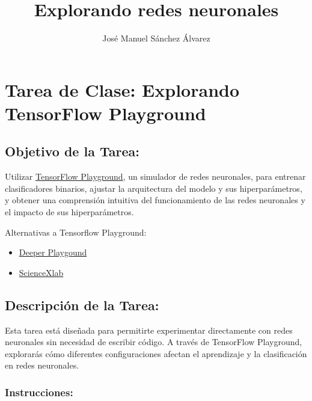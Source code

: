 \documentclass[11pt]{article}
\author{José Manuel Sánchez Álvarez}
\date{}
\title{Explorando redes neuronales}
\begin{document}
\maketitle
\setcounter{tocdepth}{3}
\tableofcontents

\setlength\parindent{10pt}

\section{Tarea de Clase: Explorando TensorFlow Playground}
\label{sec:org68ff327}

\subsection{Objetivo de la Tarea:}
\label{sec:org305690d}
Utilizar \href{https://playground.tensorflow.org/\#activation=tanh\&batchSize=10\&dataset=circle\&regDataset=reg-plane\&learningRate=0.03\&regularizationRate=0\&noise=0\&networkShape=4,2\&seed=0.19905\&showTestData=false\&discretize=false\&percTrainData=50\&x=true\&y=true\&xTimesY=false\&xSquared=false\&ySquared=false\&cosX=false\&sinX=false\&cosY=false\&sinY=false\&collectStats=false\&problem=classification\&initZero=false\&hideText=false}{TensorFlow Playground}, un simulador de redes neuronales, para
entrenar clasificadores binarios, ajustar la arquitectura del modelo y
sus hiperparámetros, y obtener una comprensión intuitiva del
funcionamiento de las redes neuronales y el impacto de sus
hiperparámetros.

Alternativas a Tensorflow Playground:
\begin{itemize}
\item \href{https://deeperplayground.org/}{Deeper Playgound}
\item \href{https://playground.scienxlab.org/}{ScienceXlab}
\end{itemize}

\subsection{Descripción de la Tarea:}
\label{sec:org89889b4}
Esta tarea está diseñada para permitirte experimentar directamente con
redes neuronales sin necesidad de escribir código. A través de
TensorFlow Playground, explorarás cómo diferentes configuraciones
afectan el aprendizaje y la clasificación en redes neuronales.

\subsubsection{Instrucciones:}
\label{sec:orgc87c837}
\end{document}
